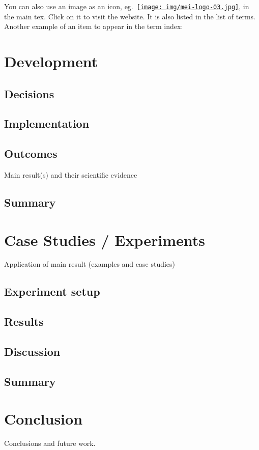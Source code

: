 \documentclass[
  oneside,
  11pt, a4paper,
  footinclude=true,
  headinclude=true,
  cleardoublepage=empty
]{scrbook}
\begin{document}
	You can also use an image as an icon, eg.~\href{http://mei.di.uminho.pt}{\texttt{[image: img/mei-logo-03.jpg]}}, in the main tex.
	Click on it to visit the website. It is also listed in the list of terms.
	Another example of an item to appear in the term index: %


	\chapter{Development}

	\section{Decisions}
    \section{Implementation}
    \section{Outcomes}
    Main result(s) and their scientific evidence
	\section{Summary}


	\chapter{Case Studies / Experiments}
		Application of main result (examples and case studies)
	\section{Experiment setup}
    \section{Results}
    \section{Discussion}
	\section{Summary}

	\chapter{Conclusion}
		Conclusions and future work.
\end{document}
